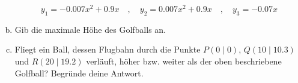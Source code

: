 \begin{exercise}
\begin{enumerate}[a)]
            \begin{equation*}
                y_1=\num{-0.007}x^2+\num{0.9}x
                \quad,\quad
                y_2=\num{0.007}x^2+\num{0.9}x
                \quad,\quad
                y_3=\num{-0.07}x
            \end{equation*}
      \item Gib die maximale Höhe des Golfballs an.
      \item Fliegt ein Ball, dessen Flugbahn durch die Punkte
            $P(0\mid0)$, $Q(10\mid\num{10.3})$ und $R(20\mid\num{19.2})$
            verläuft, höher bzw. weiter als der oben beschriebene Golfball?
            Begründe deine Antwort.
    \end{enumerate}
  \fi
\end{exercise}
